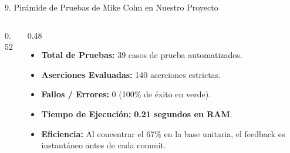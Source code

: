 \documentclass[aspectratio=169,10pt]{beamer}
\begin{document}
\begin{frame}{9. Pirámide de Pruebas de Mike Cohn en Nuestro Proyecto}
\begin{columns}
\begin{column}{0.52\textwidth}
\begin{center}
    \end{center}
\end{column}
\begin{column}{0.48\textwidth}
    \begin{tcolorbox}[colback=cardbg, colframe=cardbg, title=\color{accentgreen}\bfseries Métricas Oficiales de Ejecución]
        \begin{itemize}
            \item \textbf{Total de Pruebas:} 39 casos de prueba automatizados.
            \item \textbf{Aserciones Evaluadas:} 140 aserciones estrictas.
            \item \textbf{Fallos / Errores:} 0 (100\% de éxito en verde).
            \item \textbf{Tiempo de Ejecución:} \textbf{0.21 segundos en RAM}.
            \item \textbf{Eficiencia:} Al concentrar el 67\% en la base unitaria, el feedback es instantáneo antes de cada commit.
        \end{itemize}
    \end{tcolorbox}
\end{column}
\end{columns}
\end{frame}
\end{document}
